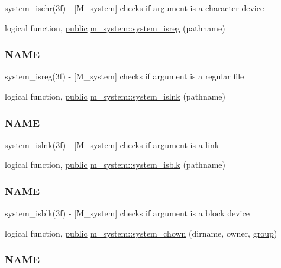 \begin{DoxyCompactItemize}
\begin{DoxyCompactList}
system\+\_\+ischr(3f) -\/ \mbox{[}M\+\_\+system\mbox{]} checks if argument is a character device \end{DoxyCompactList}\item 
logical function, \hyperlink{M__stopwatch_83_8txt_a2f74811300c361e53b430611a7d1769f}{public} \hyperlink{namespacem__system_a127bdd84ccd4b52f3f29abbc56af029b}{m\+\_\+system\+::system\+\_\+isreg} (pathname)
\begin{DoxyCompactList}\small\item\em \subsubsection*{N\+A\+ME}

system\+\_\+isreg(3f) -\/ \mbox{[}M\+\_\+system\mbox{]} checks if argument is a regular file \end{DoxyCompactList}\item 
logical function, \hyperlink{M__stopwatch_83_8txt_a2f74811300c361e53b430611a7d1769f}{public} \hyperlink{namespacem__system_ab05694cc3d76a3ecc87e4b4490c4c217}{m\+\_\+system\+::system\+\_\+islnk} (pathname)
\begin{DoxyCompactList}\small\item\em \subsubsection*{N\+A\+ME}

system\+\_\+islnk(3f) -\/ \mbox{[}M\+\_\+system\mbox{]} checks if argument is a link \end{DoxyCompactList}\item 
logical function, \hyperlink{M__stopwatch_83_8txt_a2f74811300c361e53b430611a7d1769f}{public} \hyperlink{namespacem__system_a791fa587005ec07cbcd7b0045ee6f43f}{m\+\_\+system\+::system\+\_\+isblk} (pathname)
\begin{DoxyCompactList}\small\item\em \subsubsection*{N\+A\+ME}

system\+\_\+isblk(3f) -\/ \mbox{[}M\+\_\+system\mbox{]} checks if argument is a block device \end{DoxyCompactList}\item 
logical function, \hyperlink{M__stopwatch_83_8txt_a2f74811300c361e53b430611a7d1769f}{public} \hyperlink{namespacem__system_a3353c1cff032fcfe2985a69f10038ddd}{m\+\_\+system\+::system\+\_\+chown} (dirname, owner, \hyperlink{M__stopwatch_83_8txt_a80fa32a76a22835e3c85462b2803875c}{group})
\begin{DoxyCompactList}\small\item\em \subsubsection*{N\+A\+ME}


\end{DoxyCompactList}
\end{DoxyCompactItemize}

